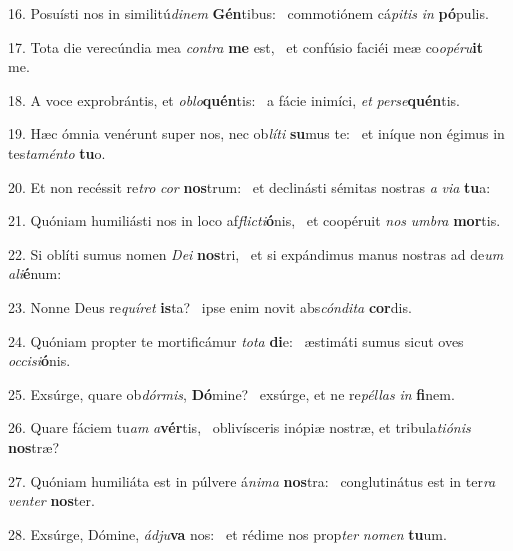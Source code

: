 16. Posuísti nos in similitú\textit{di}\textit{nem} \textbf{Gén}tibus: \ast\  commotiónem cá\textit{pi}\textit{tis} \textit{in} \textbf{pó}pulis.\

17. Tota die verecúndia mea \textit{con}\textit{tra} \textbf{me} est, \ast\  et confúsio faciéi meæ co\textit{o}\textit{pé}\textit{ru}\textbf{it} me.\

18. A voce exprobrántis, et \textit{ob}\textit{lo}\textbf{quén}tis: \ast\  a fácie inimíci, \textit{et} \textit{per}\textit{se}\textbf{quén}tis.\

19. Hæc ómnia venérunt super nos, nec ob\textit{lí}\textit{ti} \textbf{su}mus te: \ast\  et iníque non égimus in tes\textit{ta}\textit{mén}\textit{to} \textbf{tu}o.\

20. Et non recéssit re\textit{tro} \textit{cor} \textbf{nos}trum: \ast\  et declinásti sémitas nostras \textit{a} \textit{vi}\textit{a} \textbf{tu}a:\

21. Quóniam humiliásti nos in loco af\textit{flic}\textit{ti}\textbf{ó}nis, \ast\  et coopéruit \textit{nos} \textit{um}\textit{bra} \textbf{mor}tis.\

22. Si oblíti sumus nomen \textit{De}\textit{i} \textbf{nos}tri, \ast\  et si expándimus manus nostras ad de\textit{um} \textit{a}\textit{li}\textbf{é}num:\

23. Nonne Deus re\textit{quí}\textit{ret} \textbf{is}ta? \ast\  ipse enim novit abs\textit{cón}\textit{di}\textit{ta} \textbf{cor}dis.\

24. Quóniam propter te mortificámur \textit{to}\textit{ta} \textbf{di}e: \ast\  æstimáti sumus sicut oves \textit{oc}\textit{ci}\textit{si}\textbf{ó}nis.\

25. Exsúrge, quare ob\textit{dór}\textit{mis}, \textbf{Dó}mine? \ast\  exsúrge, et ne re\textit{pél}\textit{las} \textit{in} \textbf{fi}nem.\

26. Quare fáciem tu\textit{am} \textit{a}\textbf{vér}tis, \ast\  oblivísceris inópiæ nostræ, et tribula\textit{ti}\textit{ó}\textit{nis} \textbf{nos}træ?\

27. Quóniam humiliáta est in púlvere á\textit{ni}\textit{ma} \textbf{nos}tra: \ast\  conglutinátus est in ter\textit{ra} \textit{ven}\textit{ter} \textbf{nos}ter.\

28. Exsúrge, Dómine, \textit{ád}\textit{ju}\textbf{va} nos: \ast\  et rédime nos prop\textit{ter} \textit{no}\textit{men} \textbf{tu}um.\

